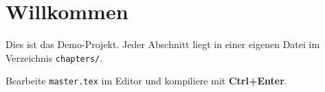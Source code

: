 \section{Willkommen}
Dies ist das Demo-Projekt. Jeder Abschnitt liegt in einer eigenen Datei
im Verzeichnis \texttt{chapters/}.

Bearbeite \texttt{master.tex} im Editor und kompiliere mit \textbf{Ctrl+Enter}.
